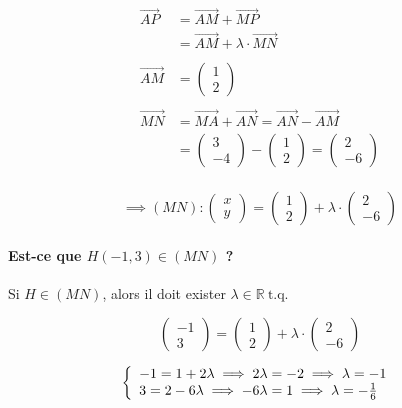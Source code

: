 \documentclass[
    11pt,
    a4paper,
    oneside,
    headinlcude, footinclude,
    twoside,
]{report}
\newcommand{\myVectorII}[2]{\begin{pmatrix}#1\\#2\end{pmatrix}}
\renewcommand{\vec}[1]{\overrightarrow{#1}}
\newcommand{\tq}[0]{ \ \textrm{t.q.}\ }
\begin{document}
\begin{center}
\begin{minipage}{.49\linewidth}
        \[
            \begin{split}
                \vec{AP} &= \vec{AM} + \vec{MP}\\
                &= \vec{AM} + \lambda \cdot \vec{MN} \\
                &\\
                \vec{AM} &= \left(\begin{array}{c}1\\2\end{array}\right)\\
                &\\
                \vec{MN} &= \vec{MA} + \vec{AN} = \vec{AN} - \vec{AM}\\
                &= \left(\begin{array}{c}3\\-4\end{array}\right) - \left(\begin{array}{c}1\\2\end{array}\right)
                    = \left(\begin{array}{c}2\\-6\end{array}\right)\\
            \end{split}
        \]
    \end{minipage}
\end{center}

$$\implies (MN): \myVectorII x y = \myVectorII 1 2 + \lambda \cdot \myVectorII 2 {-6}$$

\paragraph{Est-ce que $H (-1, 3) \in (MN)$ ?}

Si $H \in (MN)$, alors il doit exister $\lambda \in \mathbb{R} \tq$ 

$$\myVectorII {-1} 3 = \myVectorII 1 2 + \lambda \cdot \myVectorII 2 {-6}$$

\begin{equation}
    \label{eq:1.6}
    \left\{
        \begin{array}{l}
        -1 = 1 + 2 \lambda \implies 2 \lambda = -2 \implies \lambda = -1\\
        3 = 2 - 6 \lambda \implies -6 \lambda = 1 \implies \lambda = -\frac{1}{6}
        \end{array}
    \right.\\
\end{equation}
\end{document}
